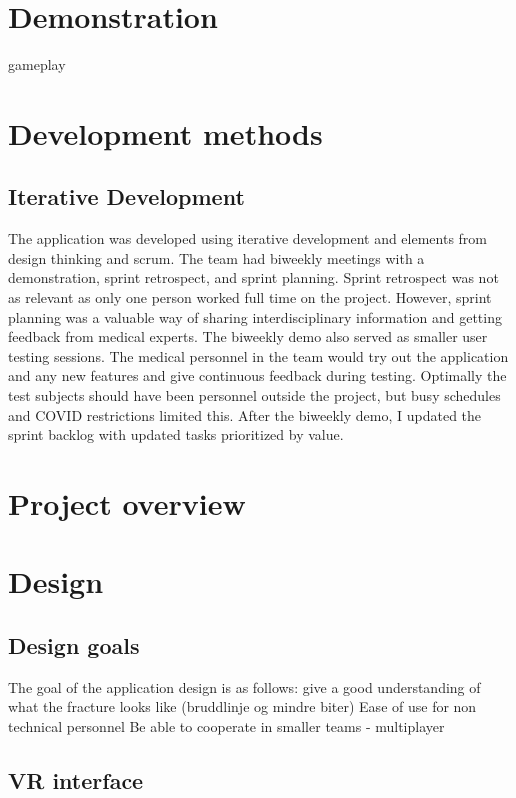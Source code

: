 \documentclass[a4paper]{report}
\begin{document}
\section{Demonstration}\label{demonstration}
gameplay

\section{Development methods}

\subsection{Iterative Development}
The application was developed using iterative development and elements from design thinking and scrum.
The team had biweekly meetings with a demonstration, sprint retrospect, and sprint planning. Sprint retrospect was not as relevant as only one person worked full time on the project. However, sprint planning was a valuable way of sharing interdisciplinary information and getting feedback from medical experts.
The biweekly demo also served as smaller user testing sessions. The medical personnel in the team would try out the application and any new features and give continuous feedback during testing. Optimally the test subjects should have been personnel outside the project, but busy schedules and COVID restrictions limited this.
After the biweekly demo, I updated the sprint backlog with updated tasks prioritized by value.

\section{Project overview}\label{CodeStructure}

\section{Design}

\subsection{Design goals}

The goal of the application design is as follows:
give a good understanding of what the fracture looks like (bruddlinje og mindre biter)
Ease of use for non technical personnel
Be able to cooperate in smaller teams - multiplayer


\subsection{VR interface}
\end{document}
